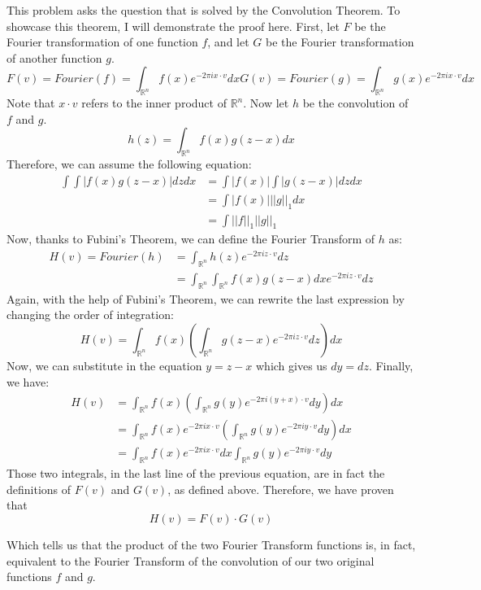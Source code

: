 \documentclass[11pt]{article}
\begin{document}
This problem asks the question that is solved by the Convolution Theorem. To showcase this theorem, I will demonstrate the proof here. First, let $F$ be the Fourier transformation of one function $f$, and let $G$ be the Fourier transformation of another function $g$.
\[
F(v) = Fourier(f) = \int_{\mathbb{R}^n} f(x) e^{-2 \pi ix \cdot v} dx
G(v) = Fourier(g) = \int_{\mathbb{R}^n} g(x) e^{-2 \pi ix \cdot v} dx
\]
Note that $x \cdot v$ refers to the inner product of $\mathbb{R}^n$. Now let $h$ be the convolution of $f$ and $g$.
\[
h(z) = \int_{\mathbb{R}^n} f(x) g(z - x) dx
\]
Therefore, we can assume the following equation:
\[
\begin{aligned}
\int \int | f(x) g(z - x) | dz dx  & = \int | f(x) | \int |g(z - x)| dz dx \\
& = \int | f(x) | ||g||_1 dx \\
& = \int ||f||_1 ||g||_1
\end{aligned}
\]
Now, thanks to Fubini's Theorem, we can define the Fourier Transform of $h$ as:
\[
\begin{aligned}
H(v) = Fourier(h) & = \int_{\mathbb{R}^n} h(z) e^{-2 \pi i z \cdot v} dz \\
& = \int_{\mathbb{R}^n} \int_{\mathbb{R}^n} f(x) g(z - x) dx e^{-2 \pi i z \cdot v} dz 
\end{aligned}
\]
Again, with the help of Fubini's Theorem, we can rewrite the last expression by changing the order of integration:
\[
H(v) = \int_{\mathbb{R}^n} f(x) (\int_{\mathbb{R}^n} g(z - x) e^{-2 \pi i z \cdot v} dz) dx
\]
Now, we can substitute in the equation $y = z - x$ which gives us $dy = dz$. Finally, we have:
\[
\begin{aligned}
H(v) & = \int_{\mathbb{R}^n} f(x) (\int_{\mathbb{R}^n} g(y) e^{-2 \pi i (y + x) \cdot v} dy) dx \\
& = \int_{\mathbb{R}^n} f(x) e^{-2 \pi i x \cdot v} ( \int_{\mathbb{R}^n} g(y) e^{-2 \pi i y \cdot v} dy) dx \\
& = \int_{\mathbb{R}^n} f(x) e^{-2 \pi i x \cdot v} dx  \int_{\mathbb{R}^n} g(y) e^{-2 \pi i y \cdot v} dy
\end{aligned}
\]
Those two integrals, in the last line of the previous equation, are in fact the definitions of $F(v)$ and $G(v)$, as defined above. Therefore, we have proven that 
\[
H(v) = F(v) \cdot G(v)
\]

Which tells us that the product of the two Fourier Transform functions is, in fact, equivalent to the Fourier Transform of the convolution of our two original functions $f$ and $g$.
\end{document}
